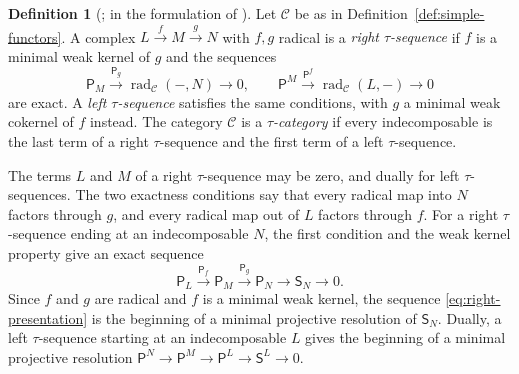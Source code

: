 \documentclass[a4paper,reqno,10pt]{amsart}
\theoremstyle{definition}
\newtheorem{definition}[theorem]{Definition}
\numberwithin{equation}{section}
\DeclareMathOperator{\rad}{rad}
\newcommand{\cC}{\mathcal C}
\begin{document}
\begin{definition}[{\cite[Section~2.1]{IyamaI}}; in the formulation of {\cite[Section~1.3]{IyamaIV}}]\label{def:tau-category}
Let \(\cC\) be as in Definition~\ref{def:simple-functors}. A complex
\(L\xrightarrow{f}M\xrightarrow{g}N\) with \(f,g\) radical is a
\emph{right \(\tau\)-sequence} if \(f\) is a minimal weak kernel of \(g\)
and the sequences
\[
 \mathsf P_M\xrightarrow{\mathsf P_g}\rad_{\cC}(-,N)\longrightarrow0,
 \qquad
 \mathsf P^M\xrightarrow{\mathsf P^f}\rad_{\cC}(L,-)\longrightarrow0
\]
are exact. A \emph{left \(\tau\)-sequence} satisfies the same conditions,
with \(g\) a minimal weak cokernel of \(f\) instead. The category \(\cC\)
is a \emph{\(\tau\)-category} if every indecomposable is the last term of
a right \(\tau\)-sequence and the first term of a left
\(\tau\)-sequence.
\end{definition}
The terms \(L\) and \(M\) of a right \(\tau\)-sequence may be zero, and
dually for left \(\tau\)-sequences.
The two exactness conditions say that every radical map into \(N\)
factors through \(g\), and every radical map out of \(L\) factors through
\(f\). For a right \(\tau\)-sequence ending at an indecomposable \(N\), the
first condition and the weak kernel property give an exact sequence
\begin{equation}\label{eq:right-presentation}
 \mathsf P_L\xrightarrow{\mathsf P_f}\mathsf P_M\xrightarrow{\mathsf P_g}
 \mathsf P_N\longrightarrow\mathsf S_N\longrightarrow0.
\end{equation}
Since \(f\) and \(g\) are radical and \(f\) is a minimal weak kernel, the sequence \eqref{eq:right-presentation} is the
beginning of a minimal projective resolution of \(\mathsf S_N\). Dually, a
left \(\tau\)-sequence starting at an indecomposable \(L\) gives the
beginning of a minimal projective resolution
\(\mathsf P^N\to\mathsf P^M\to\mathsf P^L\to\mathsf S^L\to0\).
\end{document}
